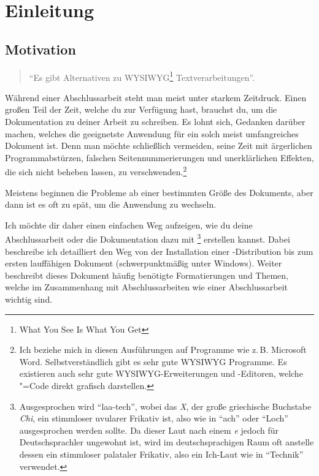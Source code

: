 %
%

\chapter{Einleitung}

\section{Motivation}
\label{sec:motivation}

\begin{quote}
\enquote{Es gibt Alternativen zu WYSIWYG\footnote{What You See Is What You Get} Textverarbeitungen}.
\end{quote}

Während einer Abschlussarbeit steht man meist unter starkem Zeitdruck. Einen großen Teil der Zeit, welche du zur Verfügung hast, brauchst du, um die Dokumentation zu deiner Arbeit zu schreiben. Es lohnt sich, Gedanken darüber machen, welches die geeignetste Anwendung für ein solch meist umfangreiches Dokument ist. Denn man möchte schließlich vermeiden, seine Zeit mit ärgerlichen Programmabstürzen, falschen Seitennummerierungen und unerklärlichen Effekten, die sich nicht beheben lassen, zu verschwenden.\footnote{Ich beziehe mich in diesen Ausführungen auf Programme wie z.\,B. Microsoft Word. Selbstverständlich gibt es sehr gute WYSIWYG Programme. Es existieren auch sehr gute WYSIWYG-Erweiterungen und -Editoren, welche \DMLLaTeX"=Code direkt grafisch darstellen.}

Meistens beginnen die Probleme ab einer bestimmten Größe des Dokuments, aber dann ist es oft zu spät, um die Anwendung zu wechseln.

Ich möchte dir daher einen einfachen Weg aufzeigen, wie du deine Abschlussarbeit oder die Dokumentation dazu mit \DMLLaTeX\footnote{Ausgesprochen wird \DMLLaTeX{} \enquote{laa-tech}, wobei das \emph{X}, der große griechische Buchstabe \emph{Chi}, ein stimmloser uvularer Frikativ ist, also wie in \enquote{ach} oder \enquote{Loch} ausgesprochen werden sollte. Da dieser Laut nach einem \emph{e} jedoch für Deutschsprachler ungewohnt ist, wird im deutschsprachigen Raum oft anstelle dessen ein stimmloser palataler Frikativ, also ein Ich-Laut wie in \enquote{Technik} verwendet.} erstellen kannst. Dabei beschreibe ich detailliert den Weg von der Installation einer \DMLLaTeX-Distribution bis zum ersten lauf\/fähigen Dokument (schwerpunktmäßig unter Windows). Weiter beschreibt dieses Dokument häufig benötigte Formatierungen und Themen, welche im Zusammenhang mit Abschlussarbeiten wie einer Abschlussarbeit wichtig sind.

